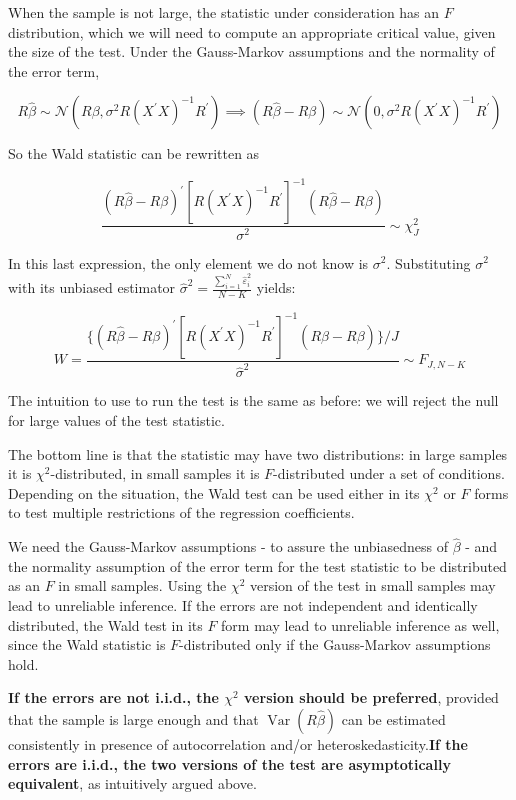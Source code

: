 When the sample is not large, the statistic under consideration has an $F$ distribution, which we will need to compute an appropriate critical value, given the size of the test. Under the Gauss-Markov assumptions and the normality of the error term,

\[
R\widehat{\beta} \sim \mathcal{N}\left(R\beta, \sigma^{2}R(X^{\prime}X)^{-1}R^{\prime}\right)
\implies (R\widehat{\beta} - R \beta) \sim \mathcal{N} \left(0, \sigma^{2}R(X^{\prime}X)^{-1}R^{\prime}\right)
\]

So the Wald statistic can be rewritten as

\[
\frac{(R\widehat{\beta} - R\beta)^{\prime}\left[R(X^{\prime}X)^{-1}R^{\prime}\right]^{-1}(R\widehat{\beta} - R\beta)}{\sigma^{2}} \sim \chi_{J}^{2}
\]

In this last expression, the only element we do not know is $\sigma^{2}$. Substituting $\sigma^{2}$ with its unbiased estimator $\widehat{\sigma}^{2} = \frac{\sum_{i=1}^{N} \widehat{\varepsilon}_{i}^{2}}{N-K}$ yields:

\[
W = \frac{ \{(R\widehat{\beta} - R\beta)^{\prime}\left[R(X^{\prime}X)^{-1}R^{\prime}\right]^{-1}(R\widehat{\beta} - R\beta)\}/J}{\widehat{\sigma}^{2}} \sim F_{J, N-K}
\]

The intuition to use to run the test is the same as before: we will reject the null for large values of the test statistic.

The bottom line is that the statistic may have two distributions: in large samples it is $\chi^2$-distributed, in small samples it is $F$-distributed under a set of conditions. Depending on the situation, the Wald test can be used either in its $\chi^{2}$ or $F$ forms to test multiple restrictions of the regression coefficients. 

We need the Gauss-Markov assumptions - to assure the unbiasedness of $\widehat{\beta}$ - and the normality assumption of the error term for the test statistic to be distributed as an $F$ in small samples. Using the $\chi^{2}$ version of the test in small samples may lead to unreliable inference. If the errors are not independent and identically distributed, the Wald test in its $F$ form may lead to unreliable inference as well, since the Wald statistic is $F$-distributed only if the Gauss-Markov assumptions hold. 

\textbf{If the errors are not i.i.d., the $\chi^{2}$ version should be preferred}, provided that the sample is large enough and that $\operatorname{Var}(R \widehat{\beta})$ can be estimated consistently in presence of autocorrelation and/or heteroskedasticity.\textbf{If the errors are i.i.d., the two versions of the test are asymptotically equivalent}, as intuitively argued above. 

